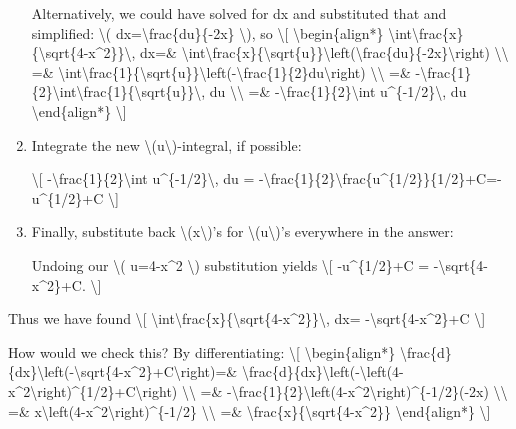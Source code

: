 \begin{enumerate}
  Alternatively, we could have solved for dx and substituted that and
  simplified: \textbackslash{}( dx=\textbackslash{}frac\{du\}\{-2x\}
  \textbackslash{}), so \textbackslash{}{[}
  \textbackslash{}begin\{align*\}
  \textbackslash{}int\textbackslash{}frac\{x\}\{\textbackslash{}sqrt\{4-x\^{}2\}\}\textbackslash{},
  dx=\&
  \textbackslash{}int\textbackslash{}frac\{x\}\{\textbackslash{}sqrt\{u\}\}\textbackslash{}left(\textbackslash{}frac\{du\}\{-2x\}\textbackslash{}right)
  \textbackslash{}\textbackslash{} =\&
  \textbackslash{}int\textbackslash{}frac\{1\}\{\textbackslash{}sqrt\{u\}\}\textbackslash{}left(-\textbackslash{}frac\{1\}\{2\}du\textbackslash{}right)
  \textbackslash{}\textbackslash{} =\&
  -\textbackslash{}frac\{1\}\{2\}\textbackslash{}int\textbackslash{}frac\{1\}\{\textbackslash{}sqrt\{u\}\}\textbackslash{},
  du \textbackslash{}\textbackslash{} =\&
  -\textbackslash{}frac\{1\}\{2\}\textbackslash{}int
  u\^{}\{-1/2\}\textbackslash{}, du \textbackslash{}end\{align*\}
  \textbackslash{}{]}
\item
  Integrate the new \textbackslash{}(u\textbackslash{})-integral, if
  possible:

  \textbackslash{}{[} -\textbackslash{}frac\{1\}\{2\}\textbackslash{}int
  u\^{}\{-1/2\}\textbackslash{}, du =
  -\textbackslash{}frac\{1\}\{2\}\textbackslash{}frac\{u\^{}\{1/2\}\}\{1/2\}+C=-u\^{}\{1/2\}+C
  \textbackslash{}{]}
\item
  Finally, substitute back \textbackslash{}(x\textbackslash{})'s for
  \textbackslash{}(u\textbackslash{})'s everywhere in the answer:

  Undoing our \textbackslash{}( u=4-x\^{}2 \textbackslash{})
  substitution yields \textbackslash{}{[} -u\^{}\{1/2\}+C =
  -\textbackslash{}sqrt\{4-x\^{}2\}+C. \textbackslash{}{]}
\end{enumerate}

Thus we have found \textbackslash{}{[}
\textbackslash{}int\textbackslash{}frac\{x\}\{\textbackslash{}sqrt\{4-x\^{}2\}\}\textbackslash{},
dx= -\textbackslash{}sqrt\{4-x\^{}2\}+C \textbackslash{}{]}

How would we check this? By differentiating: \textbackslash{}{[}
\textbackslash{}begin\{align*\}
\textbackslash{}frac\{d\}\{dx\}\textbackslash{}left(-\textbackslash{}sqrt\{4-x\^{}2\}+C\textbackslash{}right)=\&
\textbackslash{}frac\{d\}\{dx\}\textbackslash{}left(-\textbackslash{}left(4-x\^{}2\textbackslash{}right)\^{}\{1/2\}+C\textbackslash{}right)
\textbackslash{}\textbackslash{} =\&
-\textbackslash{}frac\{1\}\{2\}\textbackslash{}left(4-x\^{}2\textbackslash{}right)\^{}\{-1/2\}(-2x)
\textbackslash{}\textbackslash{} =\&
x\textbackslash{}left(4-x\^{}2\textbackslash{}right)\^{}\{-1/2\}
\textbackslash{}\textbackslash{} =\&
\textbackslash{}frac\{x\}\{\textbackslash{}sqrt\{4-x\^{}2\}\}
\textbackslash{}end\{align*\} \textbackslash{}{]}

